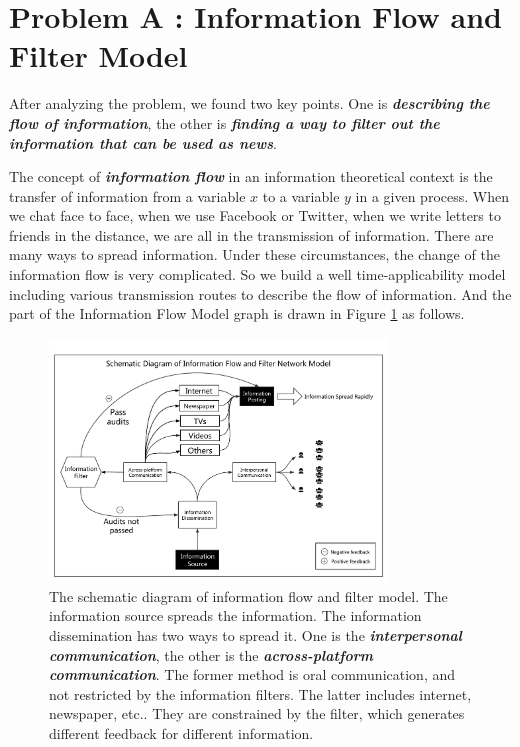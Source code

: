 \documentclass[a4paper,11pt]{article}
\begin{document}
\section{Problem A : Information Flow and Filter Model}
\par After analyzing the problem, we found two key points. One is \textbf{\emph{describing the flow of information}}, the other is \textbf{\emph{finding a way to filter out the information that can be used as news}}.
\par The concept of \textbf{\emph{information flow}} in an information theoretical context is the transfer of information from a variable $x$ to a variable $y$ in a given process\cite{RA}. When we chat face to face, when we use Facebook or Twitter, when we write letters to friends in the distance, we are all in the transmission of information. There are many ways to spread information. Under these circumstances, the change of the information flow is very complicated. So we build a well time-applicability model including various transmission routes to describe the flow of information. And the part of the Information Flow Model graph is drawn in Figure \ref{fig:Schematic_Diagram_of_Information_Flow_and_Filter_Network_Model} as follows.

\begin{figure}[h]%
    \centering 
    \includegraphics[width=0.8\textwidth]{./Pic/Schematic_Diagram_of_Information_Flow_and_Filter_Network_Model.pdf}
    \caption{The schematic diagram of information flow and filter model. The information source spreads the information. The information dissemination has two ways to spread it. One is the \textbf{\emph{interpersonal communication}}, the other is the \textbf{\emph{across-platform communication}}. The former method is oral communication, and not restricted by the information filters. The latter includes internet, newspaper, etc.. They are constrained by the filter, which generates different feedback for different information.}
    \label{fig:Schematic_Diagram_of_Information_Flow_and_Filter_Network_Model}  
\end{figure}
\end{document}
